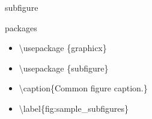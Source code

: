\documentclass{beamer}
\begin{document}
\begin{frame}{subfigure}
\begin{block}{packages}
\begin{itemize}
\pause \item \textbackslash usepackage \{graphicx\}
\pause \item \textbackslash usepackage \{subfigure\}
\end{itemize}
\end{block}
\begin{itemize}
\pause \item \textbackslash caption\{Common figure caption.\}
\pause \item \textbackslash label\{fig:sample\_subfigures\}
\end{itemize}
\end{frame}
\end{document}
